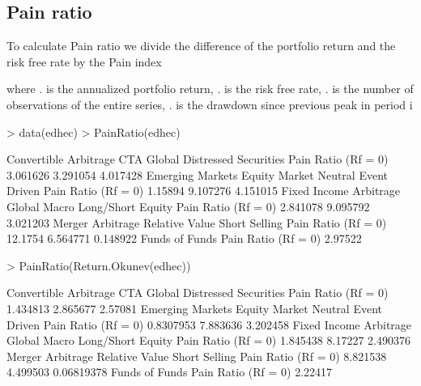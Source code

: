 \documentclass[12pt,letterpaper,english]{article}
\begin{document}
\subsection{Pain ratio}

To calculate Pain ratio we divide the difference of the portfolio return and the risk free rate by the Pain index


where . is the annualized portfolio return, . is the risk free rate, . is the number of observations of the entire series, . is the drawdown since previous peak in period i

\begin{Schunk}
\begin{Sinput}
> data(edhec)
> PainRatio(edhec)
\end{Sinput}
\begin{Soutput}
                    Convertible Arbitrage CTA Global Distressed Securities
Pain Ratio (Rf = 0)              3.061626   3.291054              4.017428
                    Emerging Markets Equity Market Neutral Event Driven
Pain Ratio (Rf = 0)          1.15894              9.107276     4.151015
                    Fixed Income Arbitrage Global Macro Long/Short Equity
Pain Ratio (Rf = 0)               2.841078     9.095792          3.021203
                    Merger Arbitrage Relative Value Short Selling
Pain Ratio (Rf = 0)          12.1754       6.564771      0.148922
                    Funds of Funds
Pain Ratio (Rf = 0)        2.97522
\end{Soutput}
\begin{Sinput}
> PainRatio(Return.Okunev(edhec))
\end{Sinput}
\begin{Soutput}
                    Convertible Arbitrage CTA Global Distressed Securities
Pain Ratio (Rf = 0)              1.434813   2.865677               2.57081
                    Emerging Markets Equity Market Neutral Event Driven
Pain Ratio (Rf = 0)        0.8307953              7.883636     3.202458
                    Fixed Income Arbitrage Global Macro Long/Short Equity
Pain Ratio (Rf = 0)               1.845438      8.17227          2.490376
                    Merger Arbitrage Relative Value Short Selling
Pain Ratio (Rf = 0)         8.821538       4.499503    0.06819378
                    Funds of Funds
Pain Ratio (Rf = 0)        2.22417
\end{Soutput}
\end{Schunk}
\end{document}
